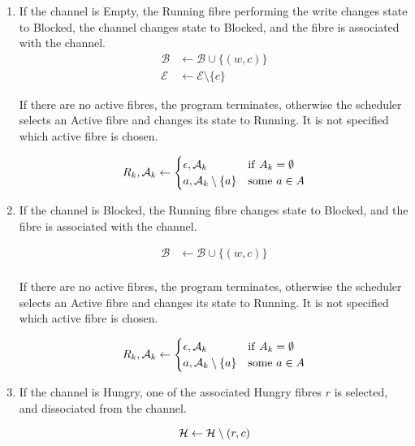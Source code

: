 \documentclass{article}
\begin{document}
\begin{enumerate}
\item If the channel is Empty, the Running fibre performing the write
changes state to Blocked, the channel changes state to Blocked,
and the fibre is associated with the channel.
\begin{align}
{\mathcal B}&\leftarrow {\mathcal B} \cup \{(w,c)\}\\
{\mathcal E} &\leftarrow {\mathcal E} \setminus \{c\}
\end{align}


If there are no active fibres, the program terminates,
otherwise the scheduler selects an Active fibre and
changes its state to Running.  It is not specified which active 
fibre is chosen.

\begin{equation}
R_k,{\mathcal A_k} \leftarrow
\begin{cases}
\epsilon,{\mathcal A_k}& {\rm if\ } A_k=\emptyset \\
a,{\mathcal A_k} \setminus \{a\} & {\rm some\ } a\in A
\end{cases}
\end{equation}


\item If the channel is Blocked, the Running fibre changes state
to Blocked, and the fibre is associated with the channel.

\begin{align}
{\mathcal B}&\leftarrow {\mathcal B} \cup \{(w,c)\}\\
\end{align}


If there are no active fibres, the program terminates,
otherwise the scheduler selects an Active fibre and
changes its state to Running.  It is not specified which active 
fibre is chosen.

\begin{equation}
R_k,{\mathcal A_k} \leftarrow
\begin{cases}
\epsilon,{\mathcal A_k}& {\rm if\ } A_k=\emptyset \\
a,{\mathcal A_k} \setminus \{a\} & {\rm some\ } a\in A
\end{cases}
\end{equation}


\item If the channel is Hungry, one of the associated Hungry fibres $r$
is selected, and dissociated from the channel.

\begin{equation}
{\mathcal H} \leftarrow {\mathcal H}\setminus (r,c)\\ 
\end{equation}



\end{enumerate}
\end{document}
